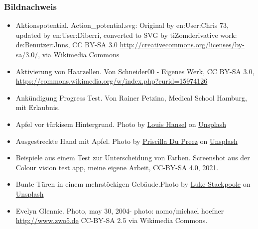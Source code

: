 \documentclass[aspectratio=169]{beamer}
\begin{document}
\begin{frame}
\frametitle{Bildnachweis}
\begin{tiny}



 
\begin{itemize}


\item
Aktionspotential. Action\_potential.svg: Original by en:User:Chris 73, updated by en:User:Diberri, converted to SVG by tiZomderivative work: de:Benutzer:Jnns, CC BY-SA 3.0 \url{http://creativecommons.org/licenses/by-sa/3.0/}, via Wikimedia Commons

\item
Aktivierung von Haarzellen. Von Schneider00 - Eigenes Werk, CC BY-SA 3.0, \url{https://commons.wikimedia.org/w/index.php?curid=15974126}

\item 
Ankündigung Progress Test. Von Rainer Petzina, Medical School Hamburg, mit Erlaubnis.


\item
Apfel vor türkisem Hintergrund. Photo by \href{https://unsplash.com/@louishansel?utm_source=unsplash&utm_medium=referral&utm_content=creditCopyText}{Louis Hansel} on \href{https://unsplash.com/s/photos/apple?utm_source=unsplash&utm_medium=referral&utm_content=creditCopyText}{Unsplash}
  
\item
Ausgestreckte Hand mit Apfel. Photo by \href{https://unsplash.com/@priscilladupreez?utm_source=unsplash&utm_medium=referral&utm_content=creditCopyText}{Priscilla Du Preez} on \href{https://unsplash.com/s/photos/apple?utm_source=unsplash&utm_medium=referral&utm_content=creditCopyText}{Unsplash}
  
  

\item
Beispiele aus einem Test zur Unterscheidung von Farben. Screenshot aus der \href{https://melamela.shinyapps.io/colour_vision/}{Colour vision test app}, meine eigene Arbeit, CC-BY-SA 4.0, 2021. 

\item
Bunte Türen in einem mehrstöckigen Gebäude.Photo by \href{https://unsplash.com/@withluke?utm_source=unsplash&utm_medium=referral&utm_content=creditCopyText}{Luke Stackpoole} on \href{https://unsplash.com/s/photos/colours?utm_source=unsplash&utm_medium=referral&utm_content=creditCopyText}{Unsplash}
  
\item
Evelyn Glennie. Photo, may 30, 2004- photo: nomo/michael hoefner \url{http://www.zwo5.de} CC-BY-SA 2.5 via Wikimedia Commons.


\end{itemize}
\end{tiny}
\end{frame}
\end{document}
